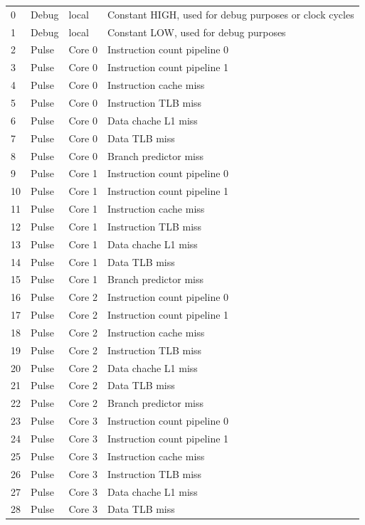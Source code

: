 \begin{center}
\begin{longtable}{|l|l|l|l|}
\hline
0 & Debug & local &  Constant HIGH, used for debug purposes or clock cycles \\
1 & Debug & local &  Constant LOW, used for debug purposes \\
2 & Pulse & Core 0 &  Instruction count pipeline 0 \\
3 & Pulse & Core 0 &  Instruction count pipeline 1 \\
4 & Pulse & Core 0 &  Instruction cache miss \\
5 & Pulse & Core 0 &  Instruction TLB miss \\
6 & Pulse & Core 0 &  Data chache L1 miss \\
7 & Pulse & Core 0 &  Data TLB miss \\
8 & Pulse & Core 0 &  Branch predictor miss \\
9 & Pulse & Core 1 &  Instruction count pipeline 0 \\
10 & Pulse & Core 1 &  Instruction count pipeline 1 \\
11 & Pulse & Core 1 &  Instruction cache miss \\
12 & Pulse & Core 1 &  Instruction TLB miss \\
13 & Pulse & Core 1 &  Data chache L1 miss \\
14 & Pulse & Core 1 &  Data TLB miss \\
15 & Pulse & Core 1 &  Branch predictor miss \\
16 & Pulse & Core 2 &  Instruction count pipeline 0 \\
17 & Pulse & Core 2 &  Instruction count pipeline 1 \\
18 & Pulse & Core 2 &  Instruction cache miss \\
19 & Pulse & Core 2 &  Instruction TLB miss \\
20 & Pulse & Core 2 &  Data chache L1 miss \\
21 & Pulse & Core 2 &  Data TLB miss \\
22 & Pulse & Core 2 &  Branch predictor miss \\
23 & Pulse & Core 3 &  Instruction count pipeline 0 \\
24 & Pulse & Core 3 &  Instruction count pipeline 1 \\
25 & Pulse & Core 3 &  Instruction cache miss \\
26 & Pulse & Core 3 &  Instruction TLB miss \\
27 & Pulse & Core 3 &  Data chache L1 miss \\
28 & Pulse & Core 3 &  Data TLB miss \\

\end{longtable}
\end{center}
